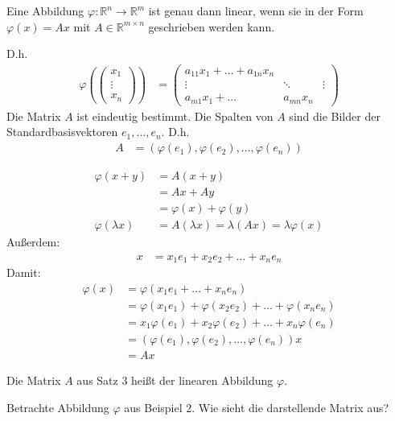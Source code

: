 Eine Abbildung $\varphi : \mathbb{R}^n \rightarrow \mathbb{R}^m$ ist genau dann linear, wenn sie in der Form $\varphi(x) = Ax$ mit $A \in \mathbb{R}^{m \times n}$ geschrieben werden kann.

D.h.
\begin{align*}
	\varphi\left(\begin{pmatrix}x_1\\\vdots\\x_n\end{pmatrix}\right) &= \begin{pmatrix}
		a_{11}x_1 + \dots + a_{1n}x_n \\
		\vdots & \ddots & \vdots \\
		a_{m1}x_1 + \dots & a_{mn}x_n
	\end{pmatrix}
\end{align*}
Die Matrix $A$ ist eindeutig bestimmt. Die Spalten von $A$ sind die Bilder der Standardbasisvektoren $e_1,\dots,e_n$. D.h.
\begin{align*}
	A &= (\varphi(e_1),\varphi(e_2),\dots,\varphi(e_n))
\end{align*}

\begin{align*}
	\varphi(x + y) &= A(x + y) \\
	&= Ax + Ay \\
	&= \varphi(x) + \varphi(y) \\
	\varphi(\lambda x) &= A(\lambda x) = \lambda(Ax) = \lambda\varphi(x)
\end{align*}
Außerdem:
\begin{align*}
	x &= x_1e_1 + x_2e_2 + \dots + x_ne_n
\end{align*}
Damit:
\begin{align*}
	\varphi(x) &= \varphi(x_1e_1 + \dots + x_ne_n) \\
	&= \varphi(x_1e_1) + \varphi(x_2e_2) + \dots + \varphi(x_ne_n) \\
	&= x_1\varphi(e_1) + x_2\varphi(e_2) + \dots + x_n\varphi(e_n) \\
	&= (\varphi(e_1),\varphi(e_2),\dots,\varphi(e_n))x \\
	&= Ax
\end{align*}

Die Matrix $A$ aus Satz 3 heißt  der linearen Abbildung $\varphi$.

Betrachte Abbildung $\varphi$ aus Beispiel 2. Wie sieht die darstellende Matrix aus?

